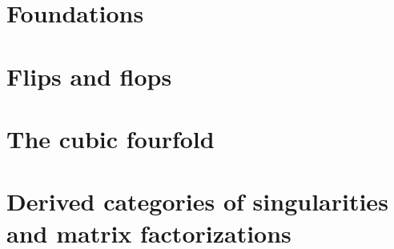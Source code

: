 \section{Foundations}

\newpage

\section{Flips and flops}

\newpage

\section{The cubic fourfold}

\newpage

\section{Derived categories of singularities and matrix factorizations}

\newpage
